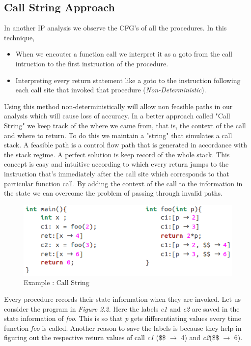 \documentclass[12pt,oneside]{book}
\begin{document}
\subsection {Call String Approach}
In another IP analysis we observe the CFG's of all the procedures. In this technique,
\begin{itemize}
\item When we encouter a function call we interpret it as a goto from the call intruction to the first instruction of the procedure.
\item Interpreting every return statement like a goto to the instruction following each call site that invoked that procedure (\textit{Non-Deterministic}).
\end{itemize}
Using this method non-deterministically will allow non feasible paths in our analysis which will cause loss of accuracy. In a better approach called "Call String" we keep track of the where we came from, that is, the context of the call and where to return. To do this we maintain a "string" that simulates a call stack. A feasible path is a control flow path that is generated in accordance with the stack regime. A perfect solution is keep record of the whole stack. This concept is easy and intuitive according to which every return jumps to the instruction that's immediately after the call site which corresponds to that particular function call. By adding the context of the call to the information in the state we can overcome the problem of passing through invalid paths.\\

\begin{figure}[htbp]
\centering
\includegraphics[scale=0.6]{callString.png}
\caption{Example : Call String}
\end{figure}  
 
Every procedure records their state information when they are invoked. Let us consider the program in \textit{Figure 2.2}. Here the labels \textit{c1} and \textit{c2} are saved in the state information of \textit{foo}. This is so that \textit{p} gets differentiating values every time function \textit{foo} is called. Another reason to save the labels is because they help in figuring out the respective return values of call \textit{c1} (\$\$ $\rightarrow$ 4) and \textit{c2}(\$\$ $\rightarrow$ 6).
\end{document}
